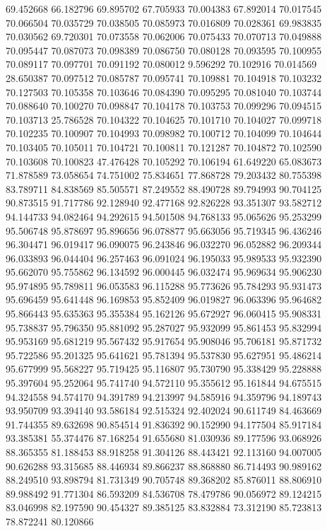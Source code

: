 69.452668
66.182796
69.895702
67.705933
70.004383
67.892014
70.017545
70.066504
70.035729
70.038505
70.085973
70.016809
70.028361
69.983835
70.030562
69.720301
70.073558
70.062006
70.075433
70.070713
70.049888
70.095447
70.087073
70.098389
70.086750
70.080128
70.093595
70.100955
70.089117
70.097701
70.091192
70.080012
9.596292
70.102916
70.014569
28.650387
70.097512
70.085787
70.095741
70.109881
70.104918
70.103232
70.127503
70.105358
70.103646
70.084390
70.095295
70.081040
70.103744
70.088640
70.100270
70.098847
70.104178
70.103753
70.099296
70.094515
70.103713
25.786528
70.104322
70.104625
70.101710
70.104027
70.099718
70.102235
70.100907
70.104993
70.098982
70.100712
70.104099
70.104644
70.103405
70.105011
70.104721
70.100811
70.121287
70.104872
70.102590
70.103608
70.100823
47.476428
70.105292
70.106194
61.649220
65.083673
71.878589
73.058654
74.751002
75.834651
77.868728
79.203432
80.755398
83.789711
84.838569
85.505571
87.249552
88.490728
89.794993
90.704125
90.873515
91.717786
92.128940
92.477168
92.826228
93.351307
93.582712
94.144733
94.082464
94.292615
94.501508
94.768133
95.065626
95.253299
95.506748
95.878697
95.896656
96.078877
95.663056
95.719345
96.436246
96.304471
96.019417
96.090075
96.243846
96.032270
96.052882
96.209344
96.033893
96.044404
96.257463
96.091024
96.195033
95.989533
95.932390
95.662070
95.755862
96.134592
96.000445
96.032474
95.969634
95.906230
95.974895
95.789811
96.053583
96.115288
95.773626
95.784293
95.931473
95.696459
95.641448
96.169853
95.852409
96.019827
96.063396
95.964682
95.866443
95.635363
95.355384
95.162126
95.672927
96.060415
95.908331
95.738837
95.796350
95.881092
95.287027
95.932099
95.861453
95.832994
95.953169
95.681219
95.567432
95.917654
95.908046
95.706181
95.871732
95.722586
95.201325
95.641621
95.781394
95.537830
95.627951
95.486214
95.677999
95.568227
95.719425
95.116807
95.730790
95.338429
95.228888
95.397604
95.252064
95.741740
94.572110
95.355612
95.161844
94.675515
94.324558
94.574170
94.391789
94.213997
94.585916
94.359796
94.189743
93.950709
93.394140
93.586184
92.515324
92.402024
90.611749
84.463669
91.744355
89.632698
90.854514
91.836392
90.152990
94.177504
85.917184
93.385381
55.374476
87.168254
91.655680
81.030936
89.177596
93.068926
88.365355
81.188453
88.918258
91.304126
88.443421
92.113160
94.007005
90.626288
93.315685
88.446934
89.866237
88.868880
86.714493
90.989162
88.249510
93.898794
81.731349
90.705748
89.368202
85.876011
88.806910
89.988492
91.771304
86.593209
84.536708
78.479786
90.056972
89.124215
83.046998
82.197590
90.454327
89.385125
83.832884
73.312190
85.723813
78.872241
80.120866
